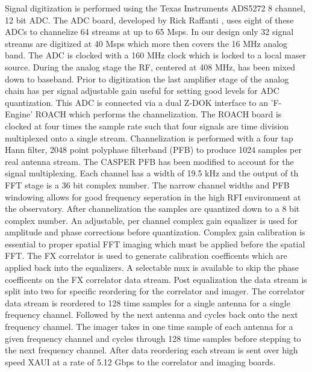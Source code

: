 \documentclass[useAMS,usenatbib,onecolumn]{mn2e}
\begin{document}
Signal digitization is performed using the Texas Instruments ADS5272 8 channel, 12 bit ADC.
The ADC board, developed by Rick Raffanti \citep{}, uses eight of these ADCs to channelize 64 streams at up to 65 Msps.
In our design only 32 signal streams are digitized at 40 Msps which more then covers the 16 MHz analog band.
The ADC is clocked with a 160 MHz clock which is locked to a local maser source.
During the analog stage the RF, centered at 408 MHz, has been mixed down to baseband.
Prior to digitization the last amplifier stage of the analog chain has per signal adjustable gain useful for setting good levels for ADC quantization.
This ADC is connected via a dual Z-DOK interface to an 'F-Engine' ROACH which performs the channelization.
The ROACH board is clocked at four times the sample rate such that four signals are time division multiplexed onto a single stream.
Channelization is performed with a four tap Hann filter, 2048 point polyphase filterband (PFB) to produce 1024 samples per real antenna stream.
The CASPER PFB has been modified to account for the signal multiplexing.
Each channel has a width of 19.5 kHz and the output of th FFT stage is a 36 bit complex number.
The narrow channel widths and PFB windowing allows for good frequency seperation in the high RFI environment at the observatory.
After channelization the samples are quantized down to a 8 bit complex number.
An adjustable, per channel complex gain equalizer is used for amplitude and phase corrections before quantization.
Complex gain calibration is essential to proper spatial FFT imaging which must be applied before the spatial FFT.
The FX correlator is used to generate calibration coefficents which are applied back into the equalizers.
A selectable mux is available to skip the phase coefficents on the FX correlator data stream.
Post equalization the data stream is split into two for specific reordering for the correlator and imager.
The correlator data stream is reordered to 128 time samples for a single antenna for a single frequency channel.
Followed by the next antenna and cycles back onto the next frequency channel.
The imager takes in one time sample of each antenna for a given frequency channel and cycles through 128 time samples before stepping to the next frequency channel.
After data reordering each stream is sent over high speed XAUI at a rate of 5.12 Gbps to the correlator and imaging boards.
\end{document}
